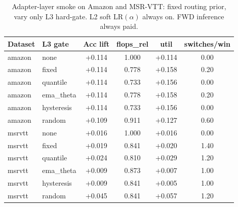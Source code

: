 \begin{table}[t]
\centering
\caption{Adapter-layer smoke on Amazon and MSR-VTT: fixed routing prior, vary only L3 hard-gate. L2 soft LR$(\alpha)$ always on. FWD inference always paid.}
\label{tab:agod-adapter-gate-layers}
\begin{tabular}{llcccc}
\toprule
Dataset & L3 gate & Acc lift & flops\_rel & util & switches/win \\
\midrule
amazon & none & +0.114 & 1.000 & +0.114 & 0.00 \\
amazon & fixed & +0.114 & 0.778 & +0.158 & 0.20 \\
amazon & quantile & +0.114 & 0.733 & +0.156 & 0.00 \\
amazon & ema\_theta & +0.114 & 0.778 & +0.158 & 0.20 \\
amazon & hysteresis & +0.114 & 0.733 & +0.156 & 0.00 \\
amazon & random & +0.109 & 0.911 & +0.127 & 0.60 \\
msrvtt & none & +0.016 & 1.000 & +0.016 & 0.00 \\
msrvtt & fixed & +0.019 & 0.841 & +0.020 & 1.40 \\
msrvtt & quantile & +0.024 & 0.810 & +0.029 & 1.20 \\
msrvtt & ema\_theta & +0.009 & 0.873 & +0.007 & 1.00 \\
msrvtt & hysteresis & +0.009 & 0.841 & +0.005 & 1.00 \\
msrvtt & random & +0.045 & 0.841 & +0.057 & 1.20 \\
\bottomrule
\end{tabular}
\end{table}
